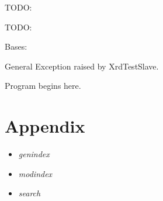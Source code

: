 \documentclass[letterpaper,10pt,english]{sphinxmanual}
\begin{document}
\begin{fulllineitems}
\begin{fulllineitems}
\label{ref-manual/XrdTestSlave:XrdTestSlave.XrdTestSlave.requestTags}
TODO:

\end{fulllineitems}


\begin{fulllineitems}
\label{ref-manual/XrdTestSlave:XrdTestSlave.XrdTestSlave.run}
TODO:

\end{fulllineitems}


\end{fulllineitems}


\begin{fulllineitems}
\label{ref-manual/XrdTestSlave:XrdTestSlave.XrdTestSlaveException}
Bases: 

General Exception raised by XrdTestSlave.

\end{fulllineitems}


\begin{fulllineitems}
\label{ref-manual/XrdTestSlave:XrdTestSlave.main}
Program begins here.

\end{fulllineitems}



\chapter{Appendix}
\label{index:appendix}\begin{itemize}
\item {} 
\emph{genindex}

\item {} 
\emph{modindex}

\item {} 
\emph{search}

\end{itemize}
\end{document}
